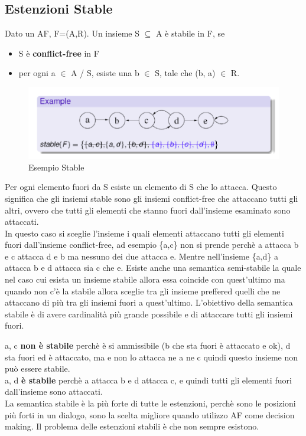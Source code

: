 \subsection{Estenzioni Stable}
Dato un AF, F=(A,R). Un insieme S $\subseteq$ A è stabile in F, se
\begin{itemize}
    \item S è \textbf{conflict-free} in F
    \item per ogni a $\in$ A / S, esiste una b $\in$ S, tale che (b, a) $\in$ R.
\end{itemize}
\begin{figure}[htp]
	\centering
    \includegraphics[width=12cm, keepaspectratio]{img/Cap6/stable.png}
    \caption{Esempio Stable}
\end{figure}
Per ogni elemento fuori da S esiste un elemento di S che lo attacca. Questo significa che gli insiemi stable sono gli insiemi conflict-free che attaccano tutti gli altri, ovvero che tutti gli elementi che stanno fuori dall’insieme esaminato sono attaccati.\\
In questo caso si sceglie l’insieme i quali elementi attaccano tutti gli elementi fuori dall’insieme conflict-free, ad esempio \{a,c\} non si prende perchè a attacca b e c attacca d e b ma nessuno dei due attacca e. Mentre nell’insieme \{a,d\} a attacca b e d attacca sia c che e. Esiste anche una semantica semi-stabile la quale nel caso cui esista un insieme stabile allora essa coincide con quest’ultimo ma quando non c’è la stabile allora sceglie tra gli insieme preffered quelli che ne attaccano di più tra gli insiemi fuori a quest’ultimo. L’obiettivo della semantica stabile è di avere cardinalità più grande possibile e di attaccare tutti gli insiemi fuori.

\vspace{0.5cm}

\noindent a, c \textbf{non è stabile} perchè è si ammissibile (b che sta fuori è attaccato e ok), d sta fuori ed è attaccato, ma e non lo attacca ne a ne c quindi questo insieme non può essere stabile.
\\a, d \textbf{è stabile} perchè a attacca b e d attacca c, e quindi tutti gli elementi fuori dall’insieme sono attaccati.
\\La semantica stabile è la più forte di tutte le estenzioni, perchè sono le posizioni più forti in un dialogo, sono la scelta migliore quando utilizzo AF come decision making. Il problema delle estenzioni stabili è che non sempre esistono.

